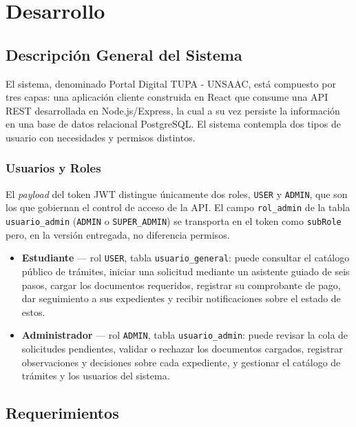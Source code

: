 \section{Desarrollo}

\subsection{Descripción General del Sistema}
El sistema, denominado Portal Digital TUPA - UNSAAC, está compuesto por tres
capas: una aplicación cliente construida en React que consume una API REST
desarrollada en Node.js/Express, la cual a su vez persiste la información en
una base de datos relacional PostgreSQL. El sistema contempla dos tipos de
usuario con necesidades y permisos distintos.

\subsubsection{Usuarios y Roles}
El \emph{payload} del token JWT distingue únicamente dos roles,
\texttt{USER} y \texttt{ADMIN}, que son los que gobiernan el control de acceso
de la API. El campo \texttt{rol\_admin} de la tabla \texttt{usuario\_admin}
(\texttt{ADMIN} o \texttt{SUPER\_ADMIN}) se transporta en el token como
\texttt{subRole} pero, en la versión entregada, no diferencia permisos.

\begin{itemize}
    \item \textbf{Estudiante} --- rol \texttt{USER}, tabla
    \texttt{usuario\_general}: puede consultar el catálogo público de
    trámites, iniciar una solicitud mediante un asistente guiado de seis
    pasos, cargar los documentos requeridos, registrar su comprobante de
    pago, dar seguimiento a sus expedientes y recibir notificaciones sobre el
    estado de estos.
    \item \textbf{Administrador} --- rol \texttt{ADMIN}, tabla
    \texttt{usuario\_admin}: puede revisar la cola de solicitudes pendientes,
    validar o rechazar los documentos cargados, registrar observaciones y
    decisiones sobre cada expediente, y gestionar el catálogo de trámites y
    los usuarios del sistema.
\end{itemize}

\subsection{Requerimientos}

